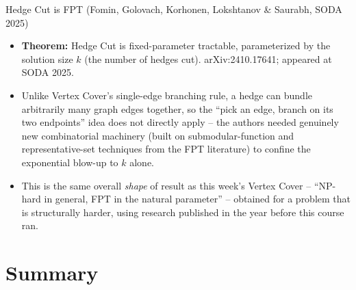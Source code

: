 \documentclass[11pt,aspectratio=169]{beamer}
\begin{document}
\begin{frame}{Hedge Cut is FPT (Fomin, Golovach, Korhonen, Lokshtanov \& Saurabh, SODA 2025)}
  \begin{itemize}
    \item \textbf{Theorem:} Hedge Cut is fixed-parameter tractable, parameterized by
    the solution size $k$ (the number of hedges cut). arXiv:2410.17641; appeared at
    SODA 2025.
    \item Unlike Vertex Cover's single-edge branching rule, a hedge can bundle
    arbitrarily many graph edges together, so the ``pick an edge, branch on its two
    endpoints'' idea does not directly apply -- the authors needed genuinely new
    combinatorial machinery (built on submodular-function and representative-set
    techniques from the FPT literature) to confine the exponential blow-up to $k$
    alone.
    \item This is the same overall \emph{shape} of result as this week's Vertex
    Cover -- ``NP-hard in general, FPT in the natural parameter'' -- obtained for a
    problem that is structurally harder, using research published in the year before
    this course ran.
  \end{itemize}
\end{frame}

\section{Summary}
\end{document}
